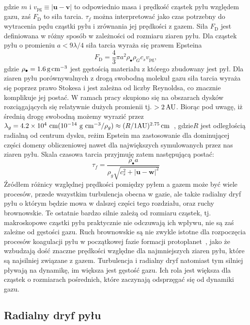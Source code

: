 gdzie $m$ i $v_{\textrm{pg}}\equiv|\mathbf{u} - \mathbf{v}|$ to odpowiednio masa
i prędkość cząstek pyłu względem gazu, zaś $F_\textrm{D}$ to siła tarcia.
$\tau_f$ można interpretować jako czas potrzebny do wytracenia pędu cząstki pyłu
i zrównania jej prędkości z gazem. Siła $F_\textrm{D}$ jest definiowana w różny
sposób w zależności od rozmiaru ziaren pyłu. Dla cząstek pyłu o promieniu $a < 9
\lambda / 4$ siła tarcia wyraża się prawem Epsteina 
\begin{equation}
   F_\textrm{D} = \frac{4}{3}\pi a^2 \rho_\bullet \rho_G c_s v_\textrm{pg}, 
\end{equation}
gdzie $\rho_\bullet = 1.6\hbox{$\thinspace\textrm{g}$}\hbox{$\thinspace\textrm{cm}$}^{-3}$ jest gęstością materiału z którego
zbudowany jest pył. Dla ziaren pyłu porównywalnych z drogą swobodną molekuł
gazu siła tarcia wyraża się poprzez prawo Stokesa i jest zależna od liczby
Reynoldsa, co znacznie komplikuje jej postać. W ramach pracy skupiono się na
obszarach dysków rozciągających się relatywnie dużych promienii tj. $>2\hbox{$\thinspace\textrm{AU}$}$.
Biorąc pod uwagę, iż średnią drogę swobodną możemy wyrazić przez $\lambda_g =
4.2\times 10^4\textrm{ cm} (10^{-14}\textrm{ g cm}^{-3}/\rho_g) \approx (R/1
\textrm{AU})^{2.75}\hbox{$\thinspace\textrm{cm}$}$~\citep{W77,BT09}, gdzie$R$ jest odległością radialną od
centrum dysku, reżim Epstein ma zastosowanie dla dominującej części domeny
obliczeniowej nawet dla największych symulowanych przez nas ziaren pyłu. Skala
czasowa tarcia przyjmuję zatem następującą postać:
%
\begin{equation} 
   \tau_f = \frac{\rho_\bullet a} {\rho_g \sqrt{c_s^2 +
      |\mathbf{u} - \mathbf{w}|^2 }} \label{eq:tauf} 
\end{equation}
%
Źródłem różnicy względnej prędkości pomiędzy pyłem a gazem może być wiele
procesów, przede wszystkim turbulencja obecna w gazie, ale także radialny dryf
pyłu o którym będzie mowa w dalszej części tego rozdziału, oraz ruchy
brownowskie. Te ostatnie bardzo silnie zależą od rozmiaru cząstek, tj.
makroskopowe cząstki pyłu praktycznie nie odczuwają ich wpływu, nie są zaś
zależne od gęstości gazu. Ruch brownowskie są nie zwykle istotne dla rozpoczęcia
procesów koagulacji pyłu w początkowej fazie formacji
protoplanet~\citep{DD2005}, jako że wzbudzają dość znaczne prędkości względne
dla najmniejszych ziaren pyłu, które są najsilniej związane z gazem. Turbulencja
i radialny dryf natomiast tym silniej pływają na dynamikę, im większa jest
gęstość gazu. Ich rola jest większa dla cząstek o rozmiarach pośrednich, które
zaczynają odsprzęgać się od dynamiki gazu.

\subsection{Radialny dryf pyłu}

